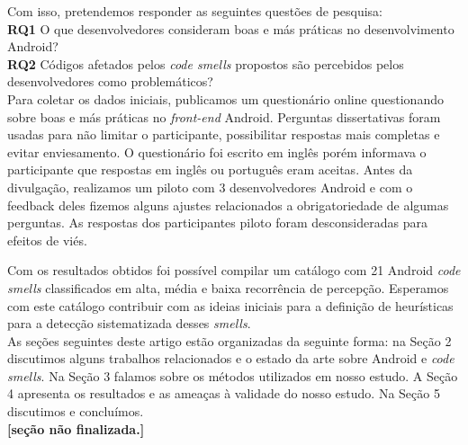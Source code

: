 Com isso, pretendemos responder as seguintes quest\~oes de pesquisa: \\

\textbf{RQ1} O que desenvolvedores consideram boas e m\'as pr\'aticas no desenvolvimento Android? \\

\textbf{RQ2} C\'odigos afetados pelos \textit{code smells} propostos s\~ao percebidos pelos desenvolvedores como problem\'aticos? \\

Para coletar os dados iniciais, publicamos um question\'ario online questionando sobre boas e m\'as pr\'aticas no \textit{front-end} Android. Perguntas dissertativas foram usadas para n\~ao limitar o participante, possibilitar respostas mais completas e evitar enviesamento. O question\'ario foi escrito em ingl\^es por\'em informava o participante que respostas em ingl\^es ou portugu\^es eram aceitas. Antes da divulga\c{c}\~ao, realizamos um piloto com 3 desenvolvedores Android e com o feedback deles fizemos alguns ajustes relacionados a obrigatoriedade de algumas perguntas. As respostas dos participantes piloto foram desconsideradas para efeitos de vi\'es. 

Com os resultados obtidos foi poss\'ivel compilar um cat\'alogo com 21 Android \textit{code smells} classificados em alta, m\'edia e baixa recorr\^encia de percep\c{c}\~ao. Esperamos com este cat\'alogo contribuir com as ideias iniciais para a defini\c{c}\~ao de heur\'isticas para a detec\c{c}\~ao sistematizada desses \textit{smells}. \\

As se\c{c}\~oes seguintes deste artigo estão organizadas da seguinte forma: na Se\c{c}\~ao 2 discutimos alguns trabalhos relacionados e o estado da arte sobre Android e \textit{code smells}. Na Se\c{c}\~ao 3 falamos sobre os m\'etodos utilizados em nosso estudo. A Se\c{c}\~ao 4 apresenta os resultados e as amea\c{c}as \`a validade do nosso estudo. Na Se\c{c}\~ao 5 discutimos e conclu\'imos.\\ 



\textbf{[se\c{c}\~ao n\~ao finalizada.]}
